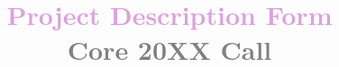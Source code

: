 \documentclass[a4paper, 11pt]{article}
\begin{document}
\title{\bf \textcolor{Plum}{Project Description Form} \\ \textcolor{Gray}{Core 20XX Call}}
\author{\vspace{-5ex}}
\date{\vspace{-5ex}}

\usepackage{natbib}

\end{document}
